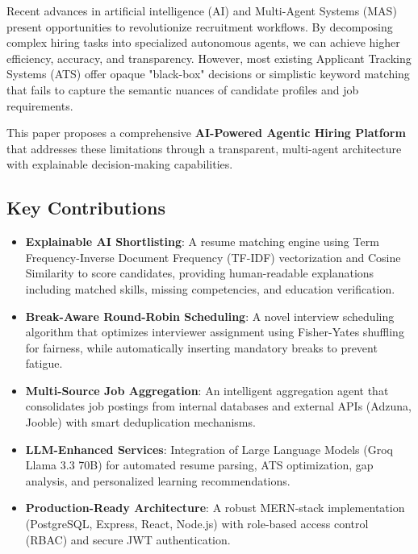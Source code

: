 \documentclass[conference]{IEEEtran}
\begin{document}
Recent advances in artificial intelligence (AI) and Multi-Agent Systems (MAS) present opportunities to revolutionize recruitment workflows. By decomposing complex hiring tasks into specialized autonomous agents, we can achieve higher efficiency, accuracy, and transparency. However, most existing Applicant Tracking Systems (ATS) offer opaque "black-box" decisions or simplistic keyword matching that fails to capture the semantic nuances of candidate profiles and job requirements.

This paper proposes a comprehensive \textbf{AI-Powered Agentic Hiring Platform} that addresses these limitations through a transparent, multi-agent architecture with explainable decision-making capabilities.

\subsection{Key Contributions}

\begin{itemize}
    \item \textbf{Explainable AI Shortlisting}: A resume matching engine using Term Frequency-Inverse Document Frequency (TF-IDF) vectorization and Cosine Similarity to score candidates, providing human-readable explanations including matched skills, missing competencies, and education verification.
    
    \item \textbf{Break-Aware Round-Robin Scheduling}: A novel interview scheduling algorithm that optimizes interviewer assignment using Fisher-Yates shuffling for fairness, while automatically inserting mandatory breaks to prevent fatigue.
    
    \item \textbf{Multi-Source Job Aggregation}: An intelligent aggregation agent that consolidates job postings from internal databases and external APIs (Adzuna, Jooble) with smart deduplication mechanisms.
    
    \item \textbf{LLM-Enhanced Services}: Integration of Large Language Models (Groq Llama 3.3 70B) for automated resume parsing, ATS optimization, gap analysis, and personalized learning recommendations.
    
    \item \textbf{Production-Ready Architecture}: A robust MERN-stack implementation (PostgreSQL, Express, React, Node.js) with role-based access control (RBAC) and secure JWT authentication.
\end{itemize}
\end{document}
